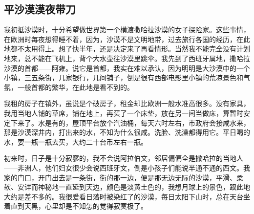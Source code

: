 \subsection{平沙漠漠夜带刀}


\par 我初抵沙漠时，十分希望做世界第一个横渡撒哈拉沙漠的女子探险家。这些事情，在欧洲时每夜想得睡不着，因为，沙漠不是文明地带，过去旅行各国的经历，在此地都不太用得上。想了快半年，还是决定来了再看情形。当然我不能完全没有计划地来，总不能在飞机上，背个大水壶往沙漠里跳伞。我先到了西班牙属地，撒哈拉沙漠的首都——阿雍。说它是首都，我实在难以承认，因为明明是大沙漠中的一个小镇，三五条街，几家银行，几间铺子，倒是很有西部电影里小镇的荒凉景色和气氛，一般首都的繁华，在此地是看不到的。
\par 我租的房子在镇外，虽说是个破房子，租金却比欧洲一般水准高很多。没有家具，我用当地人铺的草席，铺在地上，再买了一个床垫，放在另一间当做床，算暂时安定下来了。水是有的，屋顶平台放个汽油桶，每天六时左右，市政府会接咸水来，那是沙漠深井内，打出来的水，不知为什么很咸。洗脸、洗澡都得用它。平日喝的水，要一瓶一瓶去买，大约二十台币左右一瓶。
\par 初来时，日子是十分寂寥的，我不会说阿拉伯文，邻居偏偏全是撒哈拉的当地人——非洲人，他们妇女很少会说西班牙文，倒是小孩子们能说半通不通的西文。我家的门口，开门出去是一条街，街的那一边，便是那无边无际的沙漠，平滑、柔软、安详而神秘地一直延到天边，颜色是淡黄土色的，我想月球上的景色，跟此地大约是差不多的。我很爱看日落时被染红了的沙漠，每日太阳下山时，总在天台坐着直到天黑，心里却是不知怎的觉得寂寞极了。
